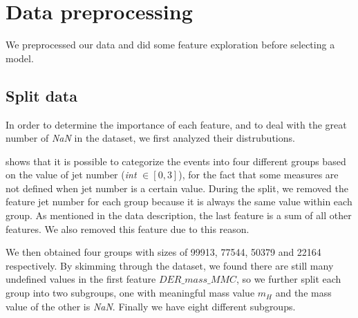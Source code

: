 \documentclass[10pt,conference,compsocconf]{IEEEtran}
\begin{document}
\section{Data preprocessing}

We preprocessed our data and did some feature exploration before selecting a model.

\subsection{Split data}
In order to determine the importance of each feature, and to deal with the great number of \emph{NaN} in the dataset, we first analyzed their distrubutions. 

\cite{higgsChallenge} shows that it is possible to categorize the events into four different groups based on the value of jet number (\emph{int} $\in [0, 3]$), for the fact that some measures are not defined when jet number is a certain value. During the split, we removed the feature jet number for each group because it is always the same value within each group. As mentioned in the data description, the last feature is a sum of all other features. We also removed this feature due to this reason. 

We then obtained four groups with sizes of 99913, 77544, 50379 and 22164 respectively. By skimming through the dataset, we found there are still many undefined values in the first feature $DER\_mass\_MMC$, so we further split each group into two subgroups, one with meaningful mass value $m_H$ and the mass value of the other is \emph{NaN}. Finally we have eight different subgroups.%
\end{document}
